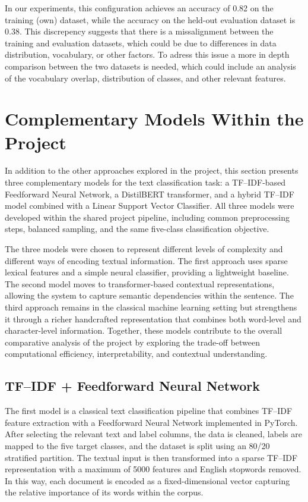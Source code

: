 \documentclass[11pt,a4paper]{article}
\begin{document}
    In our experiments, this configuration achieves an accuracy of 0.82 on the training (own) dataset, while the accuracy on the held-out evaluation dataset is 0.38.
    This discrepency suggests that there is a missalignment between the training and evaluation datasets, which could be due to differences in data distribution, vocabulary, or other factors.
    To adress this issue a more in depth comparison between the two datasets is needed, which could include an analysis of the vocabulary overlap, distribution of classes, and other relevant features.
\section{Complementary Models Within the Project }

In addition to the other approaches explored in the project, this section presents three complementary models for the text classification task: a TF--IDF-based Feedforward Neural Network, a DistilBERT transformer, and a hybrid TF--IDF model combined with a Linear Support Vector Classifier. All three models were developed within the shared project pipeline, including common preprocessing steps, balanced sampling, and the same five-class classification objective.

The three models were chosen to represent different levels of complexity and different ways of encoding textual information. The first approach uses sparse lexical features and a simple neural classifier, providing a lightweight baseline. The second model moves to transformer-based contextual representations, allowing the system to capture semantic dependencies within the sentence. The third approach remains in the classical machine learning setting but strengthens it through a richer handcrafted representation that combines both word-level and character-level information. Together, these models contribute to the overall comparative analysis of the project by exploring the trade-off between computational efficiency, interpretability, and contextual understanding.

\subsection{TF--IDF + Feedforward Neural Network}

The first model is a classical text classification pipeline that combines TF--IDF feature extraction with a Feedforward Neural Network implemented in PyTorch. After selecting the relevant text and label columns, the data is cleaned, labels are mapped to the five target classes, and the dataset is split using an 80/20 stratified partition. The textual input is then transformed into a sparse TF--IDF representation with a maximum of 5000 features and English stopwords removed. In this way, each document is encoded as a fixed-dimensional vector capturing the relative importance of its words within the corpus.
\end{document}
